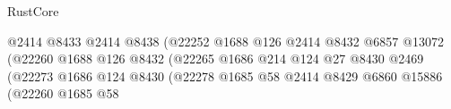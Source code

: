 \begin{lexlean}{RustCore}
\begin{coremodule}
                                                              @2414
                                                              @8433
                                                              @2414
                                                              @8438
                                                              (@22252
                                                                @1688
                                                                @126
                                                                @2414
                                                                @8432
                                                                @6857
                                                                @13072
                                                                (@22260
                                                                  @1688
                                                                  @126
                                                                  @8432
                                                                  (@22265
                                                                    @1686
                                                                    @214
                                                                    @124
                                                                    @27
                                                                    @8430
                                                                    @2469
                                                                    (@22273
                                                                      @1686
                                                                      @124
                                                                      @8430
                                                                      (@22278
                                                                        @1685
                                                                        @58
                                                                        @2414
                                                                        @8429
                                                                        @6860
                                                                        @15886
                                                                        (@22260
                                                                          @1685
                                                                          @58

\end{coremodule}
\end{lexlean}
